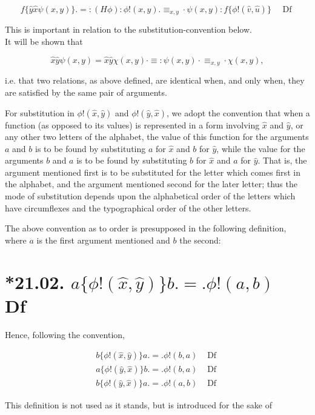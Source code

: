 \documentclass[10pt]{article}
\begin{document}
$$
f\{\hat{y} \widehat{x} \psi(x, y)\} .=:(H \phi): \phi!(x, y) . \equiv_{x, y} \cdot \psi(x, y): f\{\phi!(\widehat{v}, \widehat{u})\} \quad \text { Df }
$$

This is important in relation to the substitution-convention below.\\
It will be shown that

$$
\hat{x} \hat{y} \psi(x, y)=\hat{x} \hat{y} \chi(x, y) \cdot \equiv: \psi(x, y) \cdot \equiv_{x, y} \cdot \chi(x, y),
$$

i.e. that two relations, as above defined, are identical when, and only when, they are satisfied by the same pair of arguments.

For substitution in $\phi!(\hat{x}, \hat{y})$ and $\phi!(\hat{y}, \hat{x})$, we adopt the convention that when a function (as opposed to its values) is represented in a form involving $\hat{x}$ and $\hat{y}$, or any other two letters of the alphabet, the value of this function for the arguments $a$ and $b$ is to be found by substituting $a$ for $\hat{x}$ and $b$ for $\hat{y}$, while the value for the arguments $b$ and $a$ is to be found by substituting $b$ for $\hat{x}$ and $a$ for $\hat{y}$. That is, the argument mentioned first is to be substituted for the letter which comes first in the alphabet, and the argument mentioned second for the later letter; thus the mode of substitution depends upon the alphabetical order of the letters which have circumflexes and the typographical order of the other letters.

The above convention as to order is presupposed in the following definition, where $a$ is the first argument mentioned and $b$ the second:

\section*{*21.02. $a\{\phi!(\hat{x}, \hat{y})\} b .=. \phi!(a, b) \quad$ Df}
Hence, following the convention,

$$
\begin{array}{ll}
b\{\phi!(\hat{x}, \hat{y})\} a .=. \phi!(b, a) & \text { Df } \\
a\{\phi!(\hat{y}, \hat{x})\} b .=. \phi!(b, a) & \text { Df } \\
b\{\phi!(\hat{y}, \hat{x})\} a .=. \phi!(a, b) & \text { Df }
\end{array}
$$

This definition is not used as it stands, but is introduced for the sake of
\end{document}
